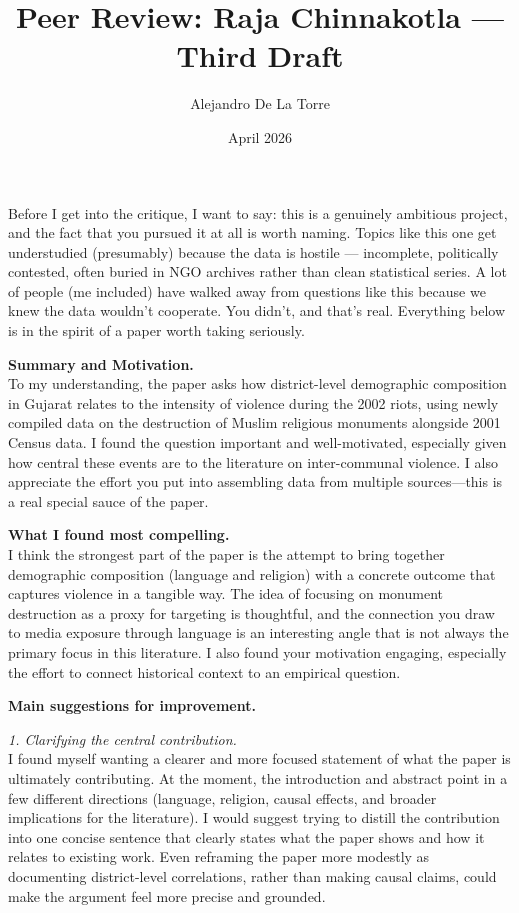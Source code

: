 \documentclass[12pt]{article}
\title{Peer Review: Raja Chinnakotla --- Third Draft}
\author{Alejandro De La Torre}
\date{April 2026}
\begin{document}
\maketitle

\singlespacing

Before I get into the critique, I want to say: this is a genuinely ambitious project, and the fact that you pursued it at all is worth naming. Topics like this one get understudied (presumably) because the data is hostile — incomplete, politically contested, often buried in NGO archives rather than clean statistical series. A lot of people (me included) have walked away from questions like this because we knew the data wouldn't cooperate. You didn't, and that's real. Everything below is in the spirit of a paper worth taking seriously.

\noindent \textbf{Summary and Motivation.} \\
To my understanding, the paper asks how district-level demographic composition in Gujarat relates to the intensity of violence during the 2002 riots, using newly compiled data on the destruction of Muslim religious monuments alongside 2001 Census data. I found the question important and well-motivated, especially given how central these events are to the literature on inter-communal violence. I also appreciate the effort you put into assembling data from multiple sources—this is a real special sauce of the paper.

\vspace{0.5em}
\noindent \textbf{What I found most compelling.} \\
I think the strongest part of the paper is the attempt to bring together demographic composition (language and religion) with a concrete outcome that captures violence in a tangible way. The idea of focusing on monument destruction as a proxy for targeting is thoughtful, and the connection you draw to media exposure through language is an interesting angle that is not always the primary focus in this literature. I also found your motivation engaging, especially the effort to connect historical context to an empirical question.

\vspace{0.5em}
\noindent \textbf{Main suggestions for improvement.}

\textit{1. Clarifying the central contribution.} \\
I found myself wanting a clearer and more focused statement of what the paper is ultimately contributing. At the moment, the introduction and abstract point in a few different directions (language, religion, causal effects, and broader implications for the literature). I would suggest trying to distill the contribution into one concise sentence that clearly states what the paper shows and how it relates to existing work. Even reframing the paper more modestly as documenting district-level correlations, rather than making causal claims, could make the argument feel more precise and grounded.
\end{document}
